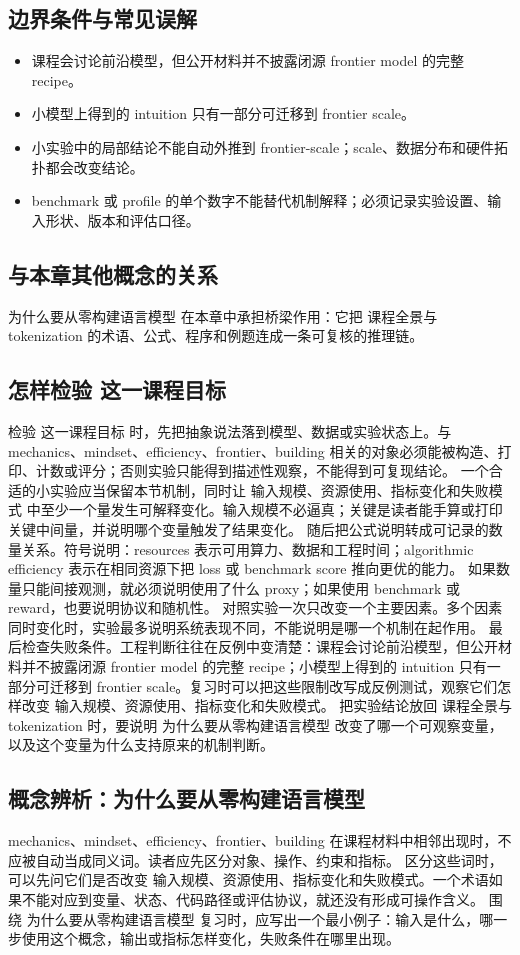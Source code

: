 \documentclass[a4paper]{article}
\begin{document}
\subsection{边界条件与常见误解}
\begin{itemize}
\item 课程会讨论前沿模型，但公开材料并不披露闭源 frontier model 的完整 recipe。
\item 小模型上得到的 intuition 只有一部分可迁移到 frontier scale。
\item 小实验中的局部结论不能自动外推到 frontier-scale；scale、数据分布和硬件拓扑都会改变结论。
\item benchmark 或 profile 的单个数字不能替代机制解释；必须记录实验设置、输入形状、版本和评估口径。
\end{itemize}
\subsection{与本章其他概念的关系}
为什么要从零构建语言模型 在本章中承担桥梁作用：它把 课程全景与 tokenization 的术语、公式、程序和例题连成一条可复核的推理链。
\subsection{怎样检验 这一课程目标}
检验 这一课程目标 时，先把抽象说法落到模型、数据或实验状态上。与 mechanics、mindset、efficiency、frontier、building 相关的对象必须能被构造、打印、计数或评分；否则实验只能得到描述性观察，不能得到可复现结论。
一个合适的小实验应当保留本节机制，同时让 输入规模、资源使用、指标变化和失败模式 中至少一个量发生可解释变化。输入规模不必逼真；关键是读者能手算或打印关键中间量，并说明哪个变量触发了结果变化。
随后把公式说明转成可记录的数量关系。符号说明：resources 表示可用算力、数据和工程时间；algorithmic efficiency 表示在相同资源下把 loss 或 benchmark score 推向更优的能力。 如果数量只能间接观测，就必须说明使用了什么 proxy；如果使用 benchmark 或 reward，也要说明协议和随机性。
对照实验一次只改变一个主要因素。多个因素同时变化时，实验最多说明系统表现不同，不能说明是哪一个机制在起作用。
最后检查失败条件。工程判断往往在反例中变清楚：课程会讨论前沿模型，但公开材料并不披露闭源 frontier model 的完整 recipe；小模型上得到的 intuition 只有一部分可迁移到 frontier scale。复习时可以把这些限制改写成反例测试，观察它们怎样改变 输入规模、资源使用、指标变化和失败模式。
把实验结论放回 课程全景与 tokenization 时，要说明 为什么要从零构建语言模型 改变了哪一个可观察变量，以及这个变量为什么支持原来的机制判断。
\subsection{概念辨析：为什么要从零构建语言模型}
mechanics、mindset、efficiency、frontier、building 在课程材料中相邻出现时，不应被自动当成同义词。读者应先区分对象、操作、约束和指标。
区分这些词时，可以先问它们是否改变 输入规模、资源使用、指标变化和失败模式。一个术语如果不能对应到变量、状态、代码路径或评估协议，就还没有形成可操作含义。
围绕 为什么要从零构建语言模型 复习时，应写出一个最小例子：输入是什么，哪一步使用这个概念，输出或指标怎样变化，失败条件在哪里出现。
\end{document}
